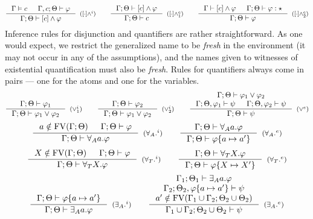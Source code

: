 \documentclass[english, mgr]{iithesis}
\begin{document}
$$
  \inference{
    \cjgmnt[\cEnv]{\constr} &
    \jgmnt[\cEnv, \constr;\Theta]{\formphi}
  }{
    \jgmnt[\cEnv;\Theta]{\fCAnd{\constr}\formphi}
  }[(\ensuremath{\fCAnd{\cdot}^i})]
  \qquad
  \inference{
    \jgmnt[\cEnv;\Theta]{\fCAnd{\constr}\formphi}
    }{
    \jgmnt[\cEnv;\Theta]{\constr}
  }[(\ensuremath{\fCAnd{\cdot}^e_1})]\qquad
  \inference{
    \jgmnt[\cEnv]{\fCAnd{\constr}\formphi} &
    \jgmnt[\cEnv;\Theta]{\formphi: \kProp}
    }{
    \jgmnt[\cEnv;\Theta]{\formphi}
  }[(\ensuremath{\fCAnd{\cdot}^e_2})]
$$
Inference rules for disjunction and quantifiers are rather straightforward.
As one would expect, we restrict the generalized name to be \textit{fresh} in the environment (it may not occur in any of the assumptions),
and the names given to witnesses of existential quantification must also be \textit{fresh}.
Rules for quantifiers always come in pairs --- one for the atoms and one for the variables.
$$
  \inference{
    \jgmnt[\cEnv;\Theta]{\formphi_1}
    }{
    \jgmnt[\cEnv;\Theta]{\formphi_1 \vee \formphi_2}
  }[(\ensuremath{\vee^i_1})]
  \qquad
  \inference{
    \jgmnt[\cEnv;\Theta]{\formphi_2}
  }{
    \jgmnt[\cEnv;\Theta]{\formphi_1 \vee \formphi_2}
  }[(\ensuremath{\vee^i_2})]
  \qquad
  \inference{
    \jgmnt[\cEnv;\Theta]{\formphi_1 \vee \formphi_2} \\
    \jgmnt[\cEnv;\Theta,\formphi_1]{\psi} &
    \jgmnt[\cEnv;\Theta,\formphi_2]{\psi}
  }{
    \jgmnt[\cEnv;\Theta]{\psi}
  }[(\ensuremath{\vee^e})]
$$
$$
  \inference{
    \atomv \notin \fv[\cEnv;\Theta] &
    \jgmnt[\cEnv;\Theta]{\formphi}
  }{
    \jgmnt[\cEnv;\Theta]{\fForallAtom{\atomv}\formphi}
  }[(\ensuremath{{\fForallAtom{}}^i})]
  \qquad
  \inference{
    \jgmnt[\cEnv;\Theta]{\fForallAtom{\atomv}\formphi}
  }{
    \jgmnt[\cEnv;\Theta]{\formphi \{\atomv \mapsto \atomv'\}}
  }[(\ensuremath{{\fForallAtom{}}^e})]
$$
$$
  \inference{
    \termv \notin \fv[\cEnv;\Theta] &
    \jgmnt[\cEnv;\Theta]{\formphi}
  }{
    \jgmnt[\cEnv;\Theta]{\fForallTerm{\termv}\formphi}
  }[(\ensuremath{{\fForallTerm{}}^i})]
  \qquad
  \inference{
    \jgmnt[\cEnv;\Theta]{\fForallTerm{\termv}\formphi}
  }{
    \jgmnt[\cEnv;\Theta]{\formphi \{\termv \mapsto \termv'\}}
  }[(\ensuremath{{\fForallTerm{}}^e})]
$$
$$
  \inference{
    \jgmnt[\cEnv;\Theta]{\formphi \{\atomv \mapsto \atomv'\}}
    }{
    \jgmnt[\cEnv;\Theta]{\fExistsAtom{\atomv}\formphi}
  }[(\ensuremath{{\fExistsAtom{}}^i})]
  \qquad
  \inference{
    \jgmnt[\cEnv_1;\Theta_1]{\fExistsAtom{\atomv}\formphi} \\
    \jgmnt[\cEnv_2;\Theta_2,\formphi \{\atomv \mapsto \atomv'\}]{\psi} \\
    \atomv' \notin \fv[\cEnv_1 \cup \cEnv_2;\Theta_2 \cup \Theta_2]
    }{
    \jgmnt[\cEnv_1 \cup \cEnv_2;\Theta_2 \cup \Theta_2]{\psi}
  }[(\ensuremath{{\fExistsAtom{}}^e})]
$$
\end{document}
